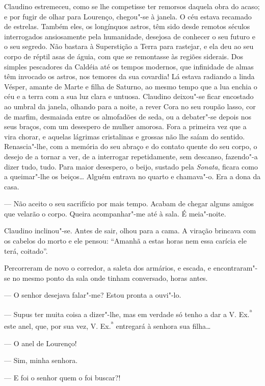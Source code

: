 Claudino estremeceu, como se lhe competisse ter remorsos daquela obra do
acaso; e por fugir de olhar para Lourenço, chegou"-se à janela. O céu
estava recamado de estrelas. Também eles, os longínquos astros, têm sido
desde remotos séculos interrogados ansiosamente pela humanidade,
desejosa de conhecer o seu futuro e o seu segredo. Não bastara à
Superstição a Terra para rastejar, e ela deu ao seu corpo de réptil asas
de águia, com que se remontasse às regiões siderais. Dos simples
pescadores da Caldéia até os tempos modernos, que infinidade de almas
têm invocado os astros, nos temores da sua covardia! Lá estava radiando
a linda Vésper, amante de Marte e filha de Saturno, ao mesmo tempo que a
lua enchia o céu e a terra com a sua luz clara e untuosa. Claudino
deixou"-se ficar encostado ao umbral da janela, olhando para a noite, a
rever Cora no seu roupão lasso, cor de marfim, desmaiada entre os
almofadões de seda, ou a debater"-se depois nos seus braços, com um
desespero de mulher amorosa. Fora a primeira vez que a vira chorar, e
aquelas lágrimas cristalinas e grossas não lhe saíam do sentido.
Renascia"-lhe, com a memória do seu abraço e do contato quente do seu
corpo, o desejo de a tornar a ver, de a interrogar repetidamente, sem
descanso, fazendo"-a dizer tudo, tudo. Para maior desespero, o beijo,
sustado pela \emph{Sonata}, ficara como a queimar"-lhe os beiços\ldots{}
Alguém entrava no quarto e chamava"-o. Era a dona da casa.

--- Não aceito o seu sacrifício por mais tempo. Acabam de chegar alguns
amigos que velarão o corpo. Queira acompanhar"-me até à sala. É
meia"-noite.

Claudino inclinou"-se. Antes de sair, olhou para a cama. A viração
brincava com os cabelos do morto e ele pensou: ``Amanhã a estas horas
nem essa carícia ele terá, coitado''.

Percorreram de novo o corredor, a saleta dos armários, e escada, e
encontraram"-se no mesmo ponto da sala onde tinham conversado, horas
antes.

--- O senhor desejava falar"-me? Estou pronta a ouvi"-lo.

--- Supus ter muita coisa a dizer"-lhe, mas em verdade só tenho a dar a
V. Ex.\textsuperscript{ª} este anel, que, por sua vez, V.
Ex.\textsuperscript{ª} entregará à senhora sua filha\ldots{}

--- O anel de Lourenço!

--- Sim, minha senhora.

--- E foi o senhor quem o foi buscar?!

